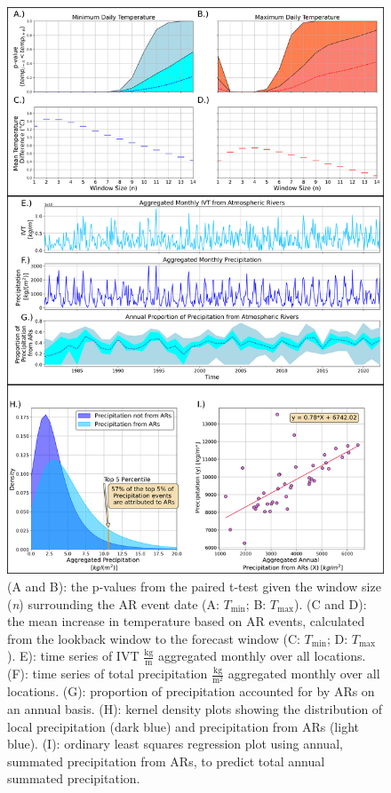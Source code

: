 \documentclass[12pts,draft]{AR_analysis_}
\begin{document}
\begin{figure}[H]
\centering
\includegraphics[width=1.0\textwidth]{./images/large.png}
\caption{(A and B): the p-values from the paired t-test given the
	window size (\emph{n}) surrounding the AR event date (A:
	$T_{\text{min}}$; B: $T_{\text{max}}$). (C and D): the mean increase
	in temperature based on AR events, calculated from the lookback 
	window to the forecast window (C: $T_{\text{min}}$; D: $T_{\text{max}}$).
	E): time series of IVT $\mathrm{\frac{kg}{m}}$ aggregated monthly 
	over all locations.
	(F): time series of total precipitation $\mathrm{\frac{kg}{m^{2}}}$ 
	aggregated monthly over all
	locations. (G): proportion of precipitation accounted for by
	ARs on an annual basis. (H): kernel density plots showing the distribution of
	local precipitation (dark blue) and precipitation from ARs
	(light blue). (I): ordinary least squares regression plot
	using annual, summated precipitation from ARs, to predict total annual
	summated precipitation.}
	
	
\label{fig:large} 
\end{figure}
\end{document}
